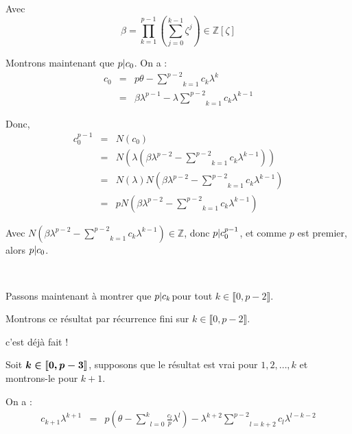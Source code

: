 Avec
\[ \beta = \underset{k = 1}{\overset{p - 1}{\prod}} \left( \underset{j =
   0}{\overset{k - 1}{\sum}} \zeta^j \right) \in \mathbb{Z} [\zeta] \]


Montrons maintenant que $p | c_0 $. On a :
\begin{eqnarray*}
  c_0 & = & p \theta - \underset{k = 1}{\overset{p - 2}{\sum}} c_k \lambda^k\\
  & = & \beta \lambda^{p - 1} - \lambda \underset{k = 1}{\overset{p -
  2}{\sum}} c_k \lambda^{k - 1}
\end{eqnarray*}


Donc,
\begin{eqnarray*}
  c^{p - 1}_0 & = & N (c_0)\\
  & = & N \left( \lambda \left( \beta \lambda^{p - 2} - \underset{k =
  1}{\overset{p - 2}{\sum}} c_k \lambda^{k - 1} \right) \right)\\
  & = & N (\lambda) N \left( \beta \lambda^{p - 2} - \underset{k =
  1}{\overset{p - 2}{\sum}} c_k \lambda^{k - 1} \right)\\
  & = & p N \left( \beta \lambda^{p - 2} - \underset{k = 1}{\overset{p -
  2}{\sum}} c_k \lambda^{k - 1} \right)
\end{eqnarray*}


Avec $N \left( \beta \lambda^{p - 2} - \underset{k = 1}{\overset{p - 2}{\sum}}
c_k \lambda^{k - 1} \right) \in \mathbb{Z}$, donc $p | c^{p - 1}_0
$, et comme $p$ est premier, alors $p | c_0 $.

\

Passons maintenant {\`a} montrer que $p | c_k  $pour tout $k \in
\llbracket 0, p - 2 \rrbracket$.

Montrons ce r{\'e}sultat par r{\'e}currence fini sur $k \in \llbracket 0, p -
2 \rrbracket$.

 c'est d{\'e}j{\`a} fait !

Soit $\boldsymbol{k \in \llbracket 0, p - 3 \rrbracket}$, supposons que le
r{\'e}sultat est vrai pour $1, 2, \ldots, k$ et montrons-le pour $k + 1$.

On a :
\begin{eqnarray*}
  c_{k + 1} \lambda^{k + 1} & = & p \left( \theta - \underset{l =
  0}{\overset{k}{\sum}} \frac{c_l}{p} \lambda^l \right) - \lambda^{k + 2}
  \underset{l = k + 2}{\overset{p - 2}{\sum}} c_l \lambda^{l - k - 2}
\end{eqnarray*}


\


